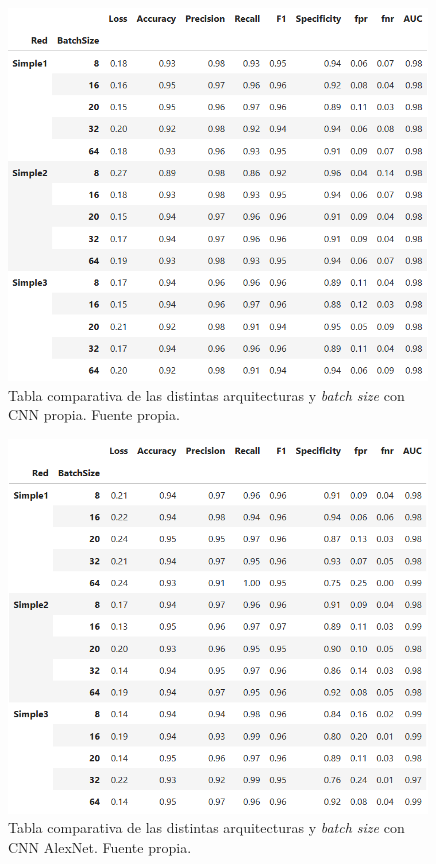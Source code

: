 \begin{figure}[h]
    \centering
    \includegraphics[width=0.99\textwidth]{img/tabla_propia_arqu_batch.PNG}
    \caption{Tabla comparativa de las distintas arquitecturas y \textit{batch size} con CNN propia. Fuente propia.}
    \label{fig:tabla_propia_arqu_batch}
\end{figure}
\FloatBarrier


\begin{figure}[h]
    \centering
    \includegraphics[width=0.99\textwidth]{img/tabla_alexNet_arqu_batch.PNG}
    \caption{Tabla comparativa de las distintas arquitecturas y \textit{batch size} con CNN AlexNet. Fuente propia.}
    \label{fig:tabla_alexNet_arqu_batch}
\end{figure}
\FloatBarrier

